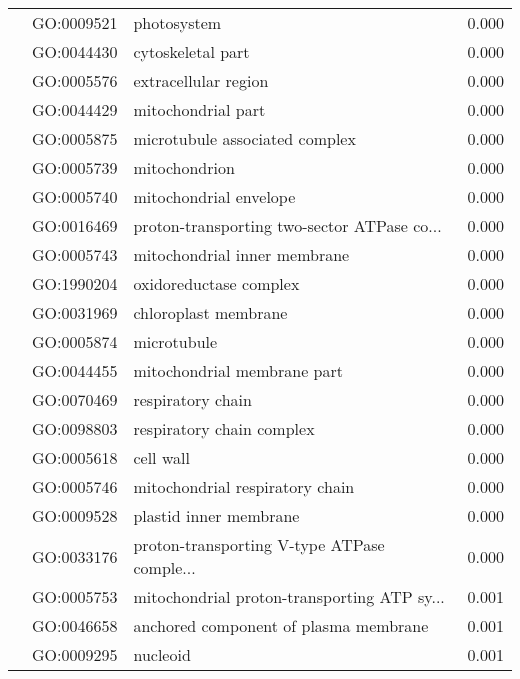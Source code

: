 \begin{longtable}{lllr}
   & GO:0009521 &                                  photosystem &         0.000 \\
   & GO:0044430 &                            cytoskeletal part &         0.000 \\
   & GO:0005576 &                         extracellular region &         0.000 \\
   & GO:0044429 &                           mitochondrial part &         0.000 \\
   & GO:0005875 &               microtubule associated complex &         0.000 \\
   & GO:0005739 &                                mitochondrion &         0.000 \\
   & GO:0005740 &                       mitochondrial envelope &         0.000 \\
   & GO:0016469 &  proton-transporting two-sector ATPase co... &         0.000 \\
   & GO:0005743 &                 mitochondrial inner membrane &         0.000 \\
   & GO:1990204 &                       oxidoreductase complex &         0.000 \\
   & GO:0031969 &                         chloroplast membrane &         0.000 \\
   & GO:0005874 &                                  microtubule &         0.000 \\
   & GO:0044455 &                  mitochondrial membrane part &         0.000 \\
   & GO:0070469 &                            respiratory chain &         0.000 \\
   & GO:0098803 &                    respiratory chain complex &         0.000 \\
   & GO:0005618 &                                    cell wall &         0.000 \\
   & GO:0005746 &              mitochondrial respiratory chain &         0.000 \\
   & GO:0009528 &                       plastid inner membrane &         0.000 \\
   & GO:0033176 &  proton-transporting V-type ATPase comple... &         0.000 \\
   & GO:0005753 &  mitochondrial proton-transporting ATP sy... &         0.001 \\
   & GO:0046658 &        anchored component of plasma membrane &         0.001 \\
   & GO:0009295 &                                     nucleoid &         0.001 \\

\end{longtable}
